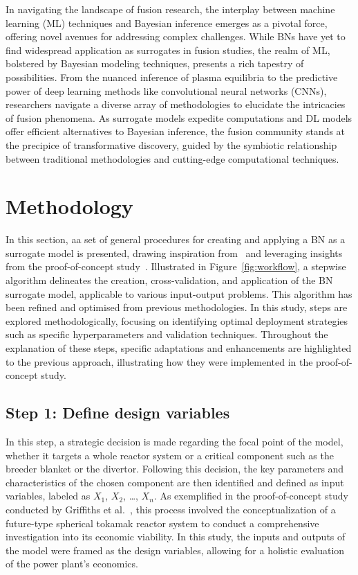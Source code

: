 \documentclass[journal]{IEEEtran}
\begin{document}
In navigating the landscape of fusion research, the interplay between machine learning (ML) techniques and Bayesian inference emerges as a pivotal force, offering novel avenues for addressing complex challenges. While BNs have yet to find widespread application as surrogates in fusion studies, the realm of ML, bolstered by Bayesian modeling techniques, presents a rich tapestry of possibilities. From the nuanced inference of plasma equilibria to the predictive power of deep learning methods like convolutional neural networks (CNNs), researchers navigate a diverse array of methodologies to elucidate the intricacies of fusion phenomena. As surrogate models expedite computations and DL models offer efficient alternatives to Bayesian inference, the fusion community stands at the precipice of transformative discovery, guided by the symbiotic relationship between traditional methodologies and cutting-edge computational techniques.

\section{Methodology}\label{sec:methodology}

In this section, aa set of general procedures for creating and applying a BN as a surrogate model is presented, drawing inspiration from~\cite{Conti2019} and leveraging insights from the proof-of-concept study~\cite{Griffiths2024}. Illustrated in Figure~\ref{fig:workflow}, a stepwise algorithm delineates the creation, cross-validation, and application of the BN surrogate model, applicable to various input-output problems. This algorithm has been refined and optimised from previous methodologies. In this study, steps are explored methodologically, focusing on identifying optimal deployment strategies such as specific hyperparameters and validation techniques. Throughout the explanation of these steps, specific adaptations and enhancements are highlighted to the previous approach, illustrating how they were implemented in the proof-of-concept study.

\subsection{\textbf{Step 1}: Define design variables}\label{sec:design}

In this step, a strategic decision is made regarding the focal point of the model, whether it targets a whole reactor system or a critical component such as the breeder blanket or the divertor. Following this decision, the key parameters and characteristics of the chosen component are then identified and defined as input variables, labeled as $X_1$, $X_2$, \ldots, $X_n$. As exemplified in the proof-of-concept study conducted by Griffiths et al.~\cite{Griffiths2024}, this process involved the conceptualization of a future-type spherical tokamak reactor system to conduct a comprehensive investigation into its economic viability. In this study, the inputs and outputs of the model were framed as the design variables, allowing for a holistic evaluation of the power plant's economics.
\end{document}
